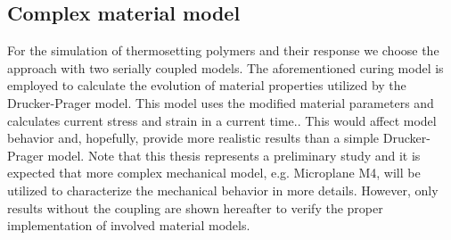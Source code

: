  \subsection{Complex material model}
 \indent
 
 For the simulation of thermosetting polymers and their response we choose the approach with two serially coupled models. The aforementioned curing model is employed to calculate the evolution of material properties utilized by the Drucker-Prager model. This model uses the modified material parameters and calculates current stress and strain in a current time.. This would affect model behavior and, hopefully, provide more realistic results than a simple Drucker-Prager model. Note that this thesis represents a preliminary study and it is expected that more complex mechanical model, e.g. Microplane M4, will be utilized to characterize the mechanical behavior in more details. However, only results without the coupling are shown hereafter to verify the proper implementation of involved material models.